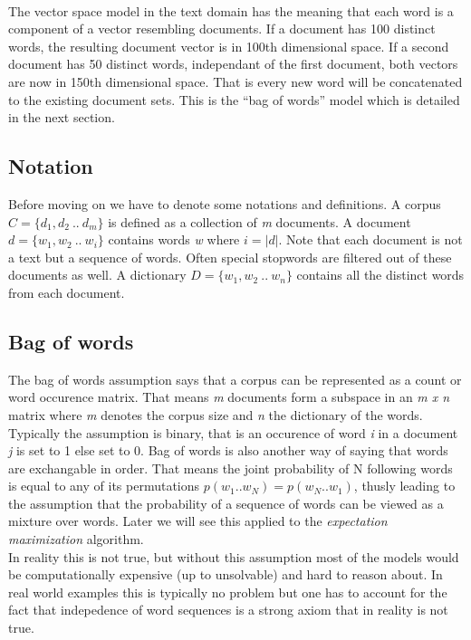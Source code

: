   \paragraph{}
    The vector space model in the text domain has the meaning that each word is a component of a vector resembling documents. If a document has 100 distinct words, the resulting document vector is in 100th dimensional space. If a second document has 50 distinct words, independant of the first document, both vectors are now in 150th dimensional space. That is every new word will be concatenated to the existing document sets. This is the ``bag of words'' model which is detailed in the next section.

  \subsection{Notation}
    Before moving on we have to denote some notations and definitions. 
    A corpus $C = \{d_1, d_2 \: .. \: d_m\}$ is defined as a collection of \emph{m} documents. A document $d = \{w_1, w_2 \: .. \: w_i\}$ contains words \emph{w} where $i = |d|$. Note that each document is not a text but a sequence of words. Often special stopwords are filtered out of these documents as well. A dictionary $D = \{w_1, w_2 \: .. \: w_n\}$ contains all the distinct words from each document.

  \subsection{Bag of words}
    The bag of words assumption says that a corpus can be represented as a count or word occurence matrix. That means \emph{m} documents form a subspace in an \emph{m x n} matrix where \emph{m} denotes the corpus size and \emph{n} the dictionary of the words. Typically the assumption is binary, that is an occurence of word \emph{i} in a document \emph{j} is set to 1 else set to 0. Bag of words is also another way of saying that words are exchangable in order. That means the joint probability of N following words is equal to any of its permutations $p(w_1..w_N) = p(w_N..w_1)$, thusly leading to the assumption that the probability of a sequence of words can be viewed as a mixture over words. Later we will see this applied to the \emph{expectation maximization} algorithm.\\
    In reality this is not true, but without this assumption most of the models would be computationally expensive (up to unsolvable) and hard to reason about. In real world examples this is typically no problem but one has to account for the fact that indepedence of word sequences is a strong axiom that in reality is not true.

